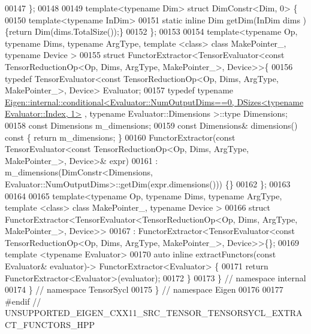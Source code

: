 \begin{DoxyCode}
00147 \};
00148 
00149 \textcolor{keyword}{template}<\textcolor{keyword}{typename} Dim> \textcolor{keyword}{struct }DimConstr<Dim, 0> \{
00150   \textcolor{keyword}{template}<\textcolor{keyword}{typename} InDim>
00151     \textcolor{keyword}{static} \textcolor{keyword}{inline} Dim getDim(InDim dims ) \{\textcolor{keywordflow}{return} Dim(dims.TotalSize());\}
00152 \};
00153 
00154 \textcolor{keyword}{template}<\textcolor{keyword}{typename} Op, \textcolor{keyword}{typename} Dims, \textcolor{keyword}{typename} ArgType, \textcolor{keyword}{template} <\textcolor{keyword}{class}> \textcolor{keyword}{class }MakePointer\_, \textcolor{keyword}{typename} Device
      >
00155 \textcolor{keyword}{struct }FunctorExtractor<TensorEvaluator<const TensorReductionOp<Op, Dims, ArgType, MakePointer\_>, Device>>\{
00156   \textcolor{keyword}{typedef} TensorEvaluator<const TensorReductionOp<Op, Dims, ArgType, MakePointer\_>, Device> Evaluator;
00157   \textcolor{keyword}{typedef} \textcolor{keyword}{typename} 
      \hyperlink{struct_eigen_1_1internal_1_1conditional}{Eigen::internal::conditional<Evaluator::NumOutputDims==0, DSizes<typename Evaluator::Index, 1>}
      , \textcolor{keyword}{typename} Evaluator::Dimensions >::type Dimensions;
00158   \textcolor{keyword}{const} Dimensions m\_dimensions;
00159   \textcolor{keyword}{const} Dimensions& dimensions()\textcolor{keyword}{ const }\{ \textcolor{keywordflow}{return} m\_dimensions; \}
00160   FunctorExtractor(\textcolor{keyword}{const} TensorEvaluator<\textcolor{keyword}{const} TensorReductionOp<Op, Dims, ArgType, MakePointer\_>, Device>&
       expr)
00161   : m\_dimensions(DimConstr<Dimensions, Evaluator::NumOutputDims>::getDim(expr.dimensions())) \{\}
00162 \};
00163 
00164 
00165 \textcolor{keyword}{template}<\textcolor{keyword}{typename} Op, \textcolor{keyword}{typename} Dims, \textcolor{keyword}{typename} ArgType, \textcolor{keyword}{template} <\textcolor{keyword}{class}> \textcolor{keyword}{class }MakePointer\_, \textcolor{keyword}{typename} Device
      >
00166 \textcolor{keyword}{struct }FunctorExtractor<TensorEvaluator<TensorReductionOp<Op, Dims, ArgType, MakePointer\_>, Device>>
00167 : FunctorExtractor<TensorEvaluator<const TensorReductionOp<Op, Dims, ArgType, MakePointer\_>, Device>>\{\};
00169 \textcolor{keyword}{template} <\textcolor{keyword}{typename} Evaluator>
00170 \textcolor{keyword}{auto} \textcolor{keyword}{inline} extractFunctors(\textcolor{keyword}{const} Evaluator& evaluator)-> FunctorExtractor<Evaluator> \{
00171   \textcolor{keywordflow}{return} FunctorExtractor<Evaluator>(evaluator);
00172 \}
00173 \}  \textcolor{comment}{// namespace internal}
00174 \}  \textcolor{comment}{// namespace TensorSycl}
00175 \}  \textcolor{comment}{// namespace Eigen}
00176 
00177 \textcolor{preprocessor}{#endif  // UNSUPPORTED\_EIGEN\_CXX11\_SRC\_TENSOR\_TENSORSYCL\_EXTRACT\_FUNCTORS\_HPP}
\end{DoxyCode}

